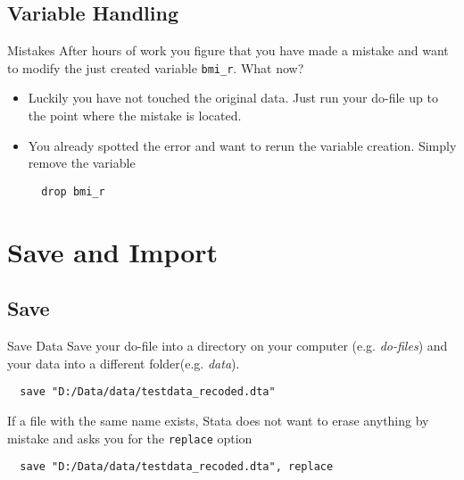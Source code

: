 \subsection{Variable Handling}
\begin{frame}[fragile]{Mistakes}  
After hours of work you figure that you have made a mistake and want to modify the just created variable \texttt{bmi\_r}. What now?
\begin{itemize}
 \item Luckily you have not touched the original data. Just run your do-file up to the point where the mistake is located.
 \item You already spotted the error and want to rerun the variable creation. Simply remove the variable
 \begin{lstlisting}
  drop bmi_r
 \end{lstlisting}
\end{itemize}
\end{frame}

\section{Save and Import}
\subsection{Save}
\begin{frame}[fragile]{Save Data}   
Save your do-file into a directory on your computer (e.g. \textit{do-files}) and your data into a different folder(e.g. \textit{data}).
\begin{lstlisting}
  save "D:/Data/data/testdata_recoded.dta"
\end{lstlisting}
If a file with the same name exists, Stata does not want to erase anything by mistake and asks you for the \texttt{replace} option
\begin{lstlisting}
  save "D:/Data/data/testdata_recoded.dta", replace
\end{lstlisting}

\end{frame}

